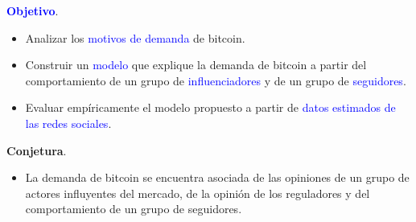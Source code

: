 \begin{frame}{}

    \textcolor{blue}{\textbf{Objetivo}}.\\
    \vspace{5mm}
    \begin{itemize}
        \setlength\itemsep{1em}
        \item[] Analizar los \textcolor{blue}{motivos de demanda} de bitcoin. 
        \item[] Construir un \textcolor{blue}{modelo} que explique la demanda de bitcoin a partir del comportamiento de un grupo de \textcolor{blue}{influenciadores} y de un grupo de \textcolor{blue}{seguidores}. 
        \item[] Evaluar empíricamente el modelo propuesto a partir de \textcolor{blue}{datos estimados de las redes sociales}. 
    \end{itemize}
 
    \vspace{5mm}
    \textcolor{dgreen}{\textbf{Conjetura}}. 
    \vspace{5mm}
    \begin{itemize}
    \item[] La \textcolor{dgreen}{demanda de bitcoin} \textcolor{dgreen}{se encuentra asociada} de las opiniones de un grupo de \textcolor{dgreen}{actores influyentes} del mercado, de la opinión de los reguladores y del comportamiento de un grupo de seguidores. 
    \end{itemize}


    
\end{frame}
